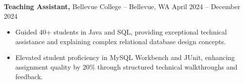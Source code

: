 \documentclass[11pt]{article}       %
\begin{document}
\textbf{Teaching Assistant,} {Bellevue College} -- Bellevue, WA \hfill April 2024 -- December 2024 \\
\vspace{-9pt}
\begin{itemize}
  \item Guided 40+ students in Java and SQL, providing exceptional technical assistance and explaining complex relational database design concepts.
  \item Elevated student proficiency in MySQL Workbench and JUnit, enhancing assignment quality by 20\% through structured technical walkthroughs and feedback.
\end{itemize}

\end{document}
